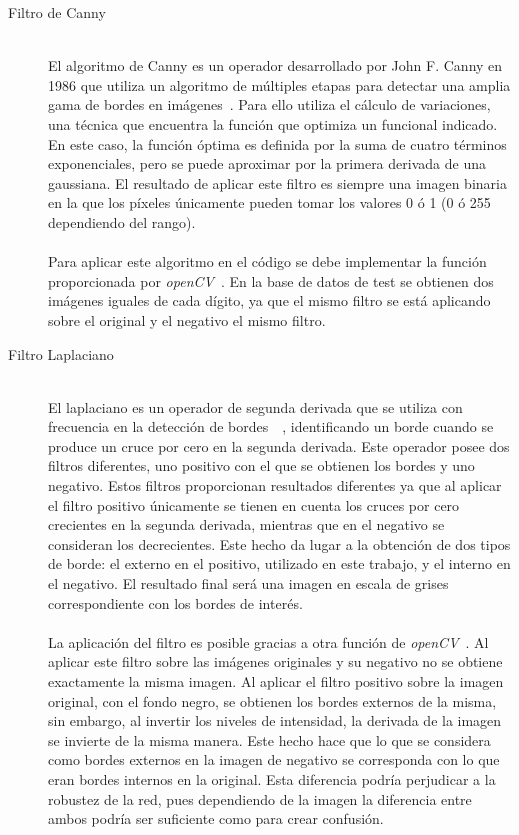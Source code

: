 \begin{description}
	\item[Filtro de Canny] \hfill 
	\vspace{5pt}
	\\
	El algoritmo de Canny es un operador desarrollado por John F. Canny en 1986 que utiliza un algoritmo de múltiples etapas para detectar una amplia gama de bordes en imágenes~\cite{4767851}. Para ello utiliza el cálculo de variaciones, una técnica que encuentra la función que optimiza un funcional indicado. En este caso, la función óptima es definida por la suma de cuatro términos exponenciales, pero se puede aproximar por la primera derivada de una gaussiana. El resultado de aplicar este filtro es siempre una imagen binaria en la que los píxeles únicamente pueden tomar los valores 0 ó 1 (0 ó 255 dependiendo del rango).\\
	\vspace{-10pt}
	\\
	Para aplicar este algoritmo en el código se debe implementar la función proporcionada por \textit{openCV}~\cite{cannyOCV}. En la base de datos de test se obtienen dos imágenes iguales de cada dígito, ya que el mismo filtro se está aplicando sobre el original y el negativo el mismo filtro.
	\vspace{5pt}
	\item[Filtro Laplaciano] \hfill 
	\vspace{5pt}
	\\
	El laplaciano es un operador de segunda derivada que se utiliza con frecuencia en la detección de bordes~\cite{laplacian}~\cite{gonzalez2008digital}, identificando un borde cuando se produce un cruce por cero en la segunda derivada. Este operador posee dos filtros diferentes, uno positivo con el que se obtienen los bordes y uno negativo. Estos filtros proporcionan resultados diferentes ya que al aplicar el filtro positivo únicamente se tienen en cuenta los cruces por cero crecientes en la segunda derivada, mientras que en el negativo se consideran los decrecientes. Este hecho da lugar a la obtención de dos tipos de borde: el externo en el positivo, utilizado en este trabajo, y el interno en el negativo. El resultado final será una imagen en escala de grises correspondiente con los bordes de interés.\\
	\vspace{-10pt}
	\\
	La aplicación del filtro es posible gracias a otra función de \textit{openCV}~\cite{laplacianOCV}. Al aplicar este filtro sobre las imágenes originales y su negativo no se obtiene exactamente la misma imagen. Al aplicar el filtro positivo sobre la imagen original, con el fondo negro, se obtienen los bordes externos de la misma, sin embargo, al invertir los niveles de intensidad, la derivada de la imagen se invierte de la misma manera. Este hecho hace que lo que se considera como bordes externos en la imagen de negativo se corresponda con lo que eran bordes internos en la original. Esta diferencia podría perjudicar a la robustez de la red, pues dependiendo de la imagen la diferencia entre ambos podría ser suficiente como para crear confusión.

\end{description}
